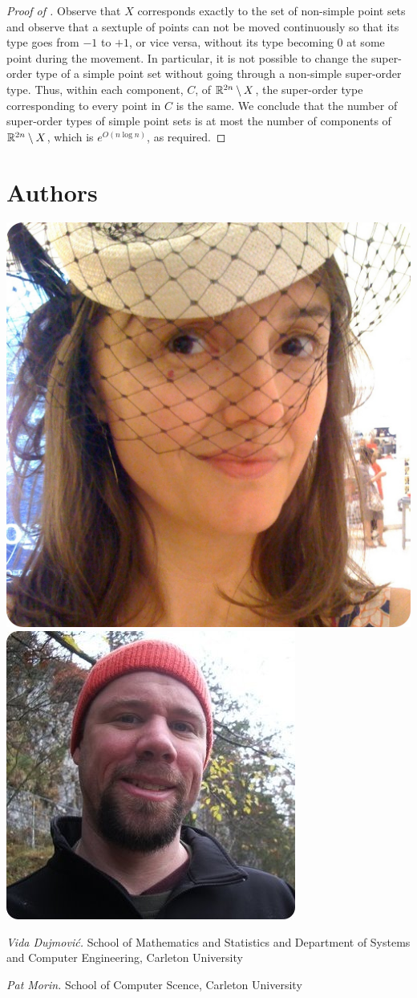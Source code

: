 \documentclass{patmorin}
\begin{document}
\begin{proof}[Proof of ]
   Observe that $X$ corresponds exactly to the set of non-simple
   point sets and observe that a sextuple of points can not be moved
   continuously so that its type goes from $-1$ to $+1$, or vice versa,
   without its type becoming $0$ at some point during the movement.
   In particular, it is not possible to change the super-order type of
   a simple point set without going through a non-simple super-order type.
   Thus, within each component, $C$, of $\mathbb{R}^{2n}\setminus X$, the
   super-order type corresponding to every point in $C$ is the same.
   We conclude that the number of super-order types of simple point
   sets is at most the number of components of $\mathbb{R}^{2n}\setminus X$,
   which is $e^{O(n\log n)}$, as required.
\end{proof}

\section*{Authors}

\noindent
\includegraphics[width=.45\textwidth]{vida-b}%
\hspace{.1\textwidth}%
\includegraphics[width=.45\textwidth]{pat-b}%

\noindent\emph{Vida Dujmovi\'c.}
School of Mathematics and Statistics and Department of Systems and Computer Engineering, Carleton University

\noindent\emph{Pat Morin.}
School of Computer Scence, Carleton University
\end{document}
